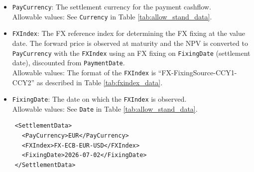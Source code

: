 \begin{itemize}
\item \lstinline!PayCurrency!: The settlement currency for the payment cashflow. \\
Allowable values: See \lstinline!Currency! in Table \ref{tab:allow_stand_data}.
\item \lstinline!FXIndex!: The FX reference index for determining the FX fixing at the value date. The forward price is observed at maturity and the NPV is converted to \lstinline!PayCurrency! with the \lstinline!FXIndex! using an FX fixing on \lstinline!FixingDate! (settlement date), discounted from \lstinline!PaymentDate!. \\
Allowable values: The format of the \lstinline!FXIndex! is ``FX-FixingSource-CCY1-CCY2'' as described in Table \ref{tab:fxindex_data}.
\item \lstinline!FixingDate!: The date on which the \lstinline!FXIndex! is observed. \\
Allowable values: See \lstinline!Date! in Table \ref{tab:allow_stand_data}.
\end{itemize}

\begin{listing}[H]
  \begin{verbatim}
    <SettlementData>
      <PayCurrency>EUR</PayCurrency>
      <FXIndex>FX-ECB-EUR-USD</FXIndex>
      <FixingDate>2026-07-02</FixingDate>
    </SettlementData>
  \end{verbatim}
  \caption{Example \lstinline!SettlementData! node}
  \label{lst:intraday_power_forward_settlement_data_node}
\end{listing}
